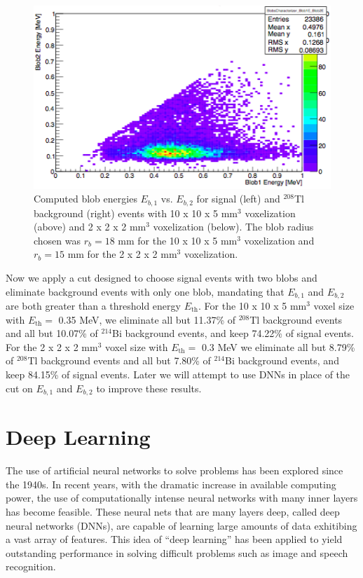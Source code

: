 \documentclass[a4paper,11pt]{article}
\begin{document}
\begin{figure}[!htb]
	\includegraphics[scale = 0.45]{fig/blobcuts_Tl208_2x2x2_E1vsE2.png}
	\caption{Computed blob energies $E_{b,1}$ vs. $E_{b,2}$ for signal (left) and $^{208}$Tl background (right) events with 10 x 10 x 5 mm$^3$ voxelization (above) and 2 x 2 x 2 mm$^3$ voxelization (below).  The blob radius chosen was $r_b = 18$ mm for the 10 x 10 x 5 mm$^3$ voxelization and $r_b = 15$ mm for the 2 x 2 x 2 mm$^3$ voxelization.} \label{fig.blobcuts}
\end{figure}

Now we apply a cut designed to choose signal events with two blobs and eliminate background events with only one blob, mandating that $E_{b,1}$ and $E_{b,2}$ are both greater than a threshold energy $E_{\mathrm{th}}$.  For the 10 x 10 x 5 mm$^3$ voxel size with $E_{\mathrm{th}} =$ 0.35 MeV, we eliminate all but 11.37\% of $^{208}$Tl background events and all but 10.07\% of $^{214}$Bi background events, and keep 74.22\% of signal events.  For the 2 x 2 x 2 mm$^3$ voxel size with $E_{\mathrm{th}} =$ 0.3 MeV we eliminate all but 8.79\% of $^{208}$Tl background events and all but 7.80\% of $^{214}$Bi background events, and keep 84.15\% of signal events.  Later we will attempt to use DNNs in place of the cut on $E_{b,1}$ and $E_{b,2}$ to improve these results.

\section{Deep Learning}
The use of artificial neural networks to solve problems has been explored since the 1940s.  In recent years, with the dramatic increase in available computing power, the use of computationally
intense neural networks with many inner layers has become feasible.  These neural nets that are many layers deep, called deep neural networks (DNNs), are capable of learning large
amounts of data exhitibing a vast array of features.  This idea of ``deep learning'' has been applied to yield outstanding performance in solving difficult problems such as image and 
speech recognition.
\end{document}

